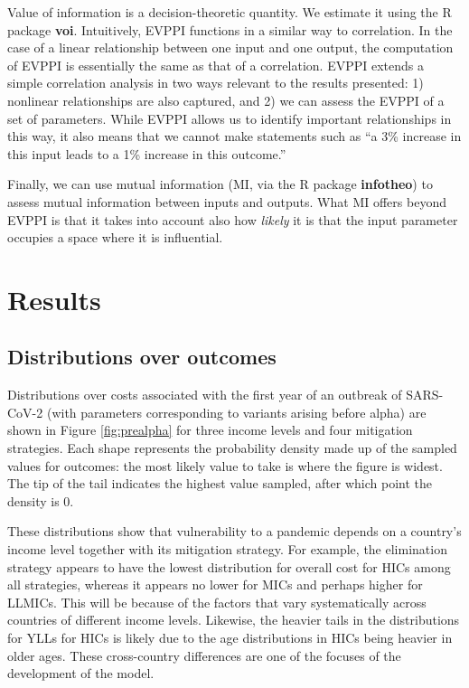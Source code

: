 \documentclass[
]{article}
\begin{document}
Value of information is a decision-theoretic quantity. We estimate it using the R package \textbf{voi}. Intuitively, EVPPI functions in a similar way to correlation. In the case of a linear relationship between one input and one output, the computation of EVPPI is essentially the same as that of a correlation. EVPPI extends a simple correlation analysis in two ways relevant to the results presented: 1) nonlinear relationships are also captured, and 2) we can assess the EVPPI of a set of parameters. While EVPPI allows us to identify important relationships in this way, it also means that we cannot make statements such as ``a 3\% increase in this input leads to a 1\% increase in this outcome.''

Finally, we can use mutual information (MI, via the R package \textbf{infotheo}) to assess mutual information between inputs and outputs. What MI offers beyond EVPPI is that it takes into account also how \emph{likely} it is that the input parameter occupies a space where it is influential.

\newpage

\hypertarget{results}{%
\section{Results}\label{results}}

\hypertarget{distributions-over-outcomes}{%
\subsection{Distributions over outcomes}\label{distributions-over-outcomes}}

Distributions over costs associated with the first year of an outbreak of SARS-CoV-2 (with parameters corresponding to variants arising before alpha) are shown in Figure \ref{fig:prealpha} for three income levels and four mitigation strategies. Each shape represents the probability density made up of the sampled values for outcomes: the most likely value to take is where the figure is widest. The tip of the tail indicates the highest value sampled, after which point the density is 0.

These distributions show that vulnerability to a pandemic depends on a country's income level together with its mitigation strategy. For example, the elimination strategy appears to have the lowest distribution for overall cost for HICs among all strategies, whereas it appears no lower for MICs and perhaps higher for LLMICs. This will be because of the factors that vary systematically across countries of different income levels. Likewise, the heavier tails in the distributions for YLLs for HICs is likely due to the age distributions in HICs being heavier in older ages. These cross-country differences are one of the focuses of the development of the model.
\end{document}
